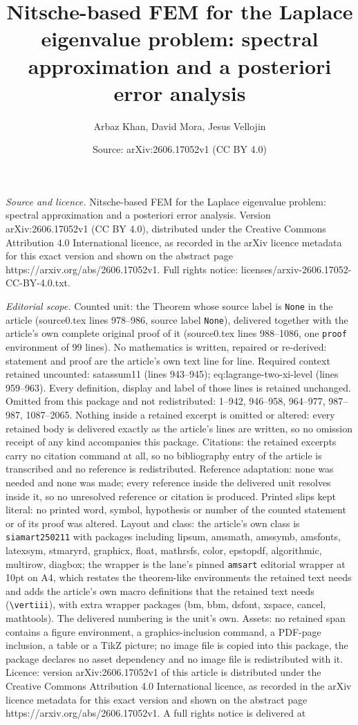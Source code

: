 \documentclass[10pt,a4paper]{amsart}
\title[Nitsche-based FEM for the Laplace eigenvalue problem: spectr]{Nitsche-based FEM for the Laplace eigenvalue problem: spectral approximation and a posteriori error analysis}
\author{Arbaz Khan, David Mora, Jesus Vellojin}
\date{Source: arXiv:2606.17052v1 (CC BY 4.0)}
\begin{document}
\maketitle

\noindent\emph{Source and licence.} Nitsche-based FEM for the Laplace eigenvalue problem: spectral approximation and a posteriori error analysis. Version arXiv:2606.17052v1 (CC BY 4.0), distributed under the Creative Commons Attribution 4.0 International licence, as recorded in the arXiv licence metadata for this exact version and shown on the abstract page https://arxiv.org/abs/2606.17052v1. Full rights notice: licenses/arxiv-2606.17052-CC-BY-4.0.txt.\par\smallskip

\noindent\textit{Editorial scope.} Counted unit: the Theorem whose source label is \texttt{None} in the article (source0.tex lines 978--986, source label \texttt{None}), delivered together with the article's own complete original proof of it (source0.tex lines 988--1086, one \texttt{proof} environment of 99 lines). No mathematics is written, repaired or re-derived: statement and proof are the article's own text line for line. Required context retained uncounted: satassum11 (lines 943--945); eq:lagrange-two-xi-level (lines 959--963). Every definition, display and label of those lines is retained unchanged. Omitted from this package and not redistributed: 1--942, 946--958, 964--977, 987--987, 1087--2065. Nothing inside a retained excerpt is omitted or altered: every retained body is delivered exactly as the article's lines are written, so no omission receipt of any kind accompanies this package. Citations: the retained excerpts carry no citation command at all, so no bibliography entry of the article is transcribed and no reference is redistributed. Reference adaptation: none was needed and none was made; every reference inside the delivered unit resolves inside it, so no unresolved reference or citation is produced. Printed slips kept literal: no printed word, symbol, hypothesis or number of the counted statement or of its proof was altered. Layout and class: the article's own class is \texttt{siamart250211} with packages including lipsum, amsmath, amssymb, amsfonts, latexsym, stmaryrd, graphicx, float, mathrsfs, color, epstopdf, algorithmic, multirow, diagbox; the wrapper is the lane's pinned \texttt{amsart} editorial wrapper at 10pt on A4, which restates the theorem-like environments the retained text needs and adds the article's own macro definitions that the retained text needs (\texttt{\textbackslash vertiii}), with extra wrapper packages (bm, bbm, dsfont, xspace, cancel, mathtools). The delivered numbering is the unit's own. Assets: no retained span contains a figure environment, a graphics-inclusion command, a PDF-page inclusion, a table or a TikZ picture; no image file is copied into this package, the package declares no asset dependency and no image file is redistributed with it. Licence: version arXiv:2606.17052v1 of this article is distributed under the Creative Commons Attribution 4.0 International licence, as recorded in the arXiv licence metadata for this exact version and shown on the abstract page https://arxiv.org/abs/2606.17052v1. A full rights notice is delivered at 
\end{document}
